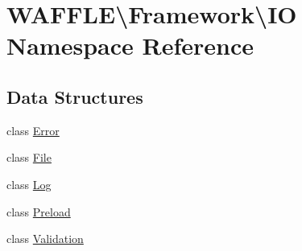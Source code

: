 \hypertarget{namespace_w_a_f_f_l_e_1_1_framework_1_1_i_o}{}\section{W\+A\+F\+F\+LE\textbackslash{}Framework\textbackslash{}IO Namespace Reference}
\label{namespace_w_a_f_f_l_e_1_1_framework_1_1_i_o}
\subsection*{Data Structures}
\begin{DoxyCompactItemize}
\item 
class \hyperlink{class_w_a_f_f_l_e_1_1_framework_1_1_i_o_1_1_error}{Error}
\item 
class \hyperlink{class_w_a_f_f_l_e_1_1_framework_1_1_i_o_1_1_file}{File}
\item 
class \hyperlink{class_w_a_f_f_l_e_1_1_framework_1_1_i_o_1_1_log}{Log}
\item 
class \hyperlink{class_w_a_f_f_l_e_1_1_framework_1_1_i_o_1_1_preload}{Preload}
\item 
class \hyperlink{class_w_a_f_f_l_e_1_1_framework_1_1_i_o_1_1_validation}{Validation}
\end{DoxyCompactItemize}
